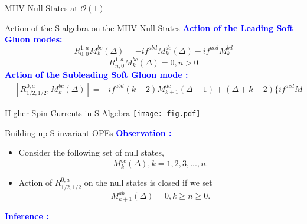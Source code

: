 \documentclass[final]{beamer}
\newlength{\colwidth}
\begin{document}
\begin{frame}[t]
\begin{columns}[t]
\begin{column}{\colwidth}
\begin{block}{MHV Null States at $\mathcal{O}(1)$}
		\end{block}
		
		\begin{block}{Action of the S algebra on the MHV Null States}
			\textcolor{blue}{\textbf{Action of the Leading Soft Gluon modes:}}
			\begin{equation}
				\label{eq:act1}
				R^{1,a}_{0,0}M^{bc}_{k}(\Delta)=-if^{abd}M^{dc}_{k}(\Delta)-if^{acd}M^{bd}_{k}
			\end{equation}
			\begin{equation}
				\label{eq:act2}
				R^{1,a}_{n,0}M^{bc}_{k}(\Delta)=0 , n>0
			\end{equation}
			\textcolor{blue}{\textbf{Action of the Subleading Soft Gluon mode :}}
			\begin{equation}
				\label{eq:new7}
				\begin{split}
					&[R^{0,a}_{1/2,1/2},M^{bc}_{k}(\Delta)]= -if^{abd}(k+2)M^{dc}_{k+1}(\Delta-1) +(\Delta+k-2) \Bigg\{if^{acd}M^{bd}_{k}(\Delta-1)+if^{abd}M^{dc}_{k}(\Delta-1)\Bigg\}
				\end{split}.
			\end{equation}
		\end{block}
	\begin{block}{Higher Spin Currents in S Algebra}
		\centering
		\texttt{[image: fig.pdf]}
	\end{block}
	\begin{block}{Building up S invariant OPEs}
		\textcolor{blue}{\textbf{Observation :}}
		\begin{itemize}
			\item[\ding{224}]
			Consider the following set of null states,
			\begin{equation}
				\label{eq:s1}
				M^{bc}_{k}(\Delta) , k=1,2,3,...,n.
			\end{equation}
			\item[\ding{224}]
			Action of $R^{0,a}_{1/2,1/2}$ on the null states is closed if we set
			\begin{equation}
				\label{eq:s2}
				M^{ab}_{k+1}(\Delta)=0, k \ge n \ge 0.
			\end{equation}
		\end{itemize}
		\textcolor{blue}{\textbf{Inference :}} 
		\begin{itemize}

\end{itemize}
\end{block}
\end{column}
\end{columns}
\end{frame}
\end{document}
